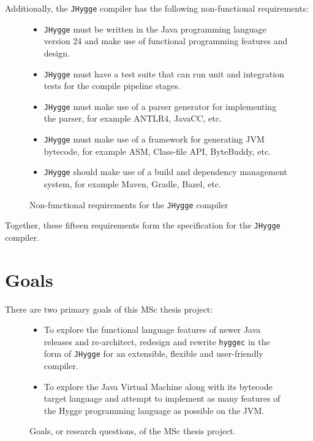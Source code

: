 Additionally, the \texttt{JHygge} compiler has the following non-functional requirements:

\begin{figure}
\centering  
\begin{itemize}
  \item \texttt{JHygge} must be written in the Java programming language version 24 and make use of functional programming features and design.
  \item \texttt{JHygge} must have a test suite that can run unit and integration tests for the compile pipeline stages.
  \item \texttt{JHygge} must make use of a parser generator for implementing the parser, for example ANTLR4, JavaCC, etc.
  \item \texttt{JHygge} must make use of a framework for generating JVM bytecode, for example ASM, Class-file API, ByteBuddy, etc.
  \item \texttt{JHygge} should make use of a build and dependency management system, for example Maven, Gradle, Bazel, etc.
\end{itemize}
\caption{Non-functional requirements for the \texttt{JHygge} compiler}
\label{fig:nonfunctional_requirements}
\end{figure}

Together, these fifteen requirements form the specification for the \texttt{JHygge} compiler.

\section{Goals}

There are two primary goals of this MSc thesis project:

\begin{figure}[H]
\centering 
\begin{itemize}
  \item To explore the functional language features of newer Java releases and re-architect, redesign and rewrite \texttt{hyggec} in the form of \texttt{JHygge} for an extensible, flexible and user-friendly compiler.
  \item To explore the Java Virtual Machine along with its bytecode target language and attempt to implement as many features of the Hygge programming language as possible on the JVM.
\end{itemize}
\caption{Goals, or research questions, of the MSc thesis project.}
\label{fig:thesis_goals}
\end{figure}

